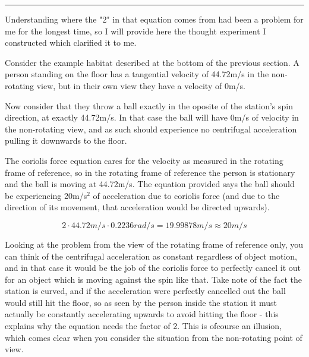 \documentclass[a4paper]{article}
\begin{document}
	\medskip
	
	\noindent\rule{\linewidth}{1pt}
	
	\medskip
	
	Understanding where the "2" in that equation comes from had been a problem for me for the longest time, so I will provide here the thought experiment I constructed which clarified it to me.
	
	\medskip
	
	Consider the example habitat described at the bottom of the previous section. A person standing on the floor has a tangential velocity of 44.72m/s in the non-rotating view, but in their own view they have a velocity of 0m/s.
	
	\medskip
	
	Now consider that they throw a ball exactly in the oposite of the station's spin direction, at exactly 44.72m/s. In that case the ball will have 0m/s of velocity in the non-rotating view, and as such should experience no centrifugal acceleration pulling it downwards to the floor.
	
	\medskip
	
	The coriolis force equation cares for the velocity as measured in the rotating frame of reference, so in the rotating frame of reference the person is stationary and the ball is moving at 44.72m/s. The equation provided says the ball should be experiencing 20m/s$^2$ of acceleration due to coriolis force (and due to the direction of its movement, that acceleration would be directed upwards).
	
	\medskip
	
	$$ 2 \cdot 44.72m/s \cdot 0.2236rad/s = 19.99878m/s \approx 20m/s $$
	
	\medskip
	
	Looking at the problem from the view of the rotating frame of reference only, you can think of the centrifugal acceleration as constant regardless of object motion, and in that case it would be the job of the coriolis force to perfectly cancel it out for an object which is moving against the spin like that. Take note of the fact the station is curved, and if the acceleration were perfectly cancelled out the ball would still hit the floor, so as seen by the person inside the station it must actually be constantly accelerating upwards to avoid hitting the floor - this explains why the equation needs the factor of 2. This is ofcourse an illusion, which comes clear when you consider the situation from the non-rotating point of view.
	
	\pagebreak
	
\end{document}
